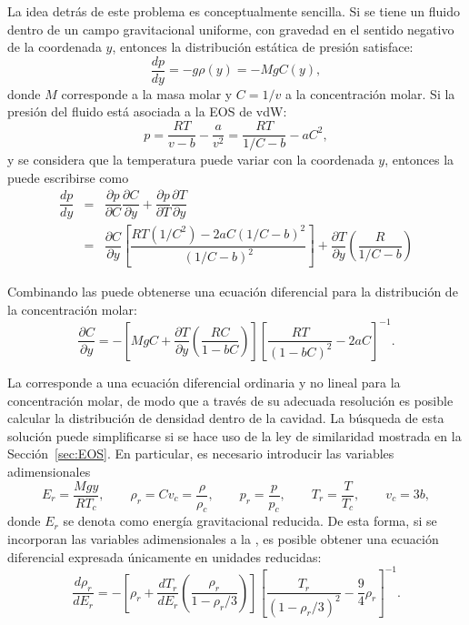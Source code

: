 La idea detr\'as de este problema es conceptualmente sencilla. Si se tiene un fluido dentro de un campo gravitacional uniforme, con gravedad en el sentido negativo de la coordenada $y$, entonces la distribuci\'on est\'atica de presi\'on satisface:
\begin{equation}
	\dfrac{dp}{dy} = -g\rho(y) = -MgC(y),
	\label{eq:p_hidrost}
\end{equation}
donde $M$ corresponde a la masa molar y $C=1/v$ a la concentraci\'on molar. Si la presi\'on del fluido est\'a asociada a la EOS de vdW:
\begin{equation}
	p = \dfrac{RT}{v-b} - \dfrac{a}{v^2} = \dfrac{RT}{1/C-b} - aC^2,
\end{equation}
y se considera que la temperatura puede variar con la coordenada $y$, entonces la  puede escribirse como
\begin{equation}
	\begin{array}{rcl}
		\dfrac{dp}{dy} &=& \dfrac{\partial p }{\partial C} \dfrac{\partial C}{\partial y}	 + \dfrac{\partial p}{\partial T}\dfrac{\partial T}{\partial y} \\[3mm]
		&=& \dfrac{\partial C}{\partial y}\left[ \dfrac{RT(1/C^2)- 2aC(1/C-b)^2}{(1/C-b)^2} \right] + \dfrac{\partial T}{\partial y}\left( \dfrac{R}{1/C-b}\right)
	\end{array}
	\label{eq:partial_p}
\end{equation}

Combinando las  puede obtenerse una ecuaci\'on diferencial para la distribuci\'on de la concentraci\'on molar:
\begin{equation}
	\dfrac{\partial C}{\partial y} = -\left[ MgC + \dfrac{\partial T}{\partial y}\left( \dfrac{RC}{1-bC} \right) \right] \left[ \dfrac{RT}{(1-bC)^2} -2aC \right]^{-1}.
	\label{eq:vdw_molar}
\end{equation} 

La  corresponde a una ecuaci\'on diferencial ordinaria y no lineal para la concentraci\'on molar, de modo que a trav\'es de su adecuada resoluci\'on es posible calcular la distribuci\'on de densidad dentro de la cavidad. 
La b\'usqueda de esta soluci\'on puede simplificarse si se hace uso de la ley de similaridad mostrada en la Secci\'on~\ref{sec:EOS}. En particular, es necesario introducir las variables adimensionales
\begin{equation}
	E_r = \dfrac{Mgy}{RT_c}, \qquad \rho_r=Cv_c=\dfrac{\rho}{\rho_c}, \qquad p_r=\dfrac{p}{p_c}, \qquad T_r = \dfrac{T}{T_c}, \qquad v_c = 3b,
\end{equation}
donde $E_r$ se denota como energ\'ia gravitacional reducida. De esta forma, si se incorporan las variables adimensionales a la , es posible obtener una ecuaci\'on diferencial expresada \'unicamente en unidades reducidas:
\begin{equation}
	\dfrac{d\rho_r}{dE_r} = -\left[ \rho_r + \dfrac{dT_r}{dE_r} \left( \dfrac{\rho_r}{1-\rho_r/3} \right) \right]
\left[ \dfrac{T_r}{(1-\rho_r/3)^2} -\dfrac{9}{4}\rho_r \right]^{-1}.
	\label{eq:vdw_column_red}
\end{equation}

